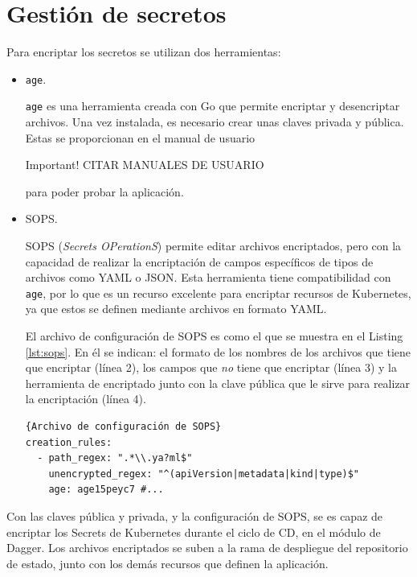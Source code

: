 \section{Gestión de secretos}
\label{sec:secrets}

Para encriptar los secretos se utilizan dos herramientas:

\begin{itemize}
  \item \texttt{age}\cite{age}.

    \texttt{age} es una herramienta creada con Go que permite encriptar y desencriptar archivos. Una vez instalada, es necesario crear unas claves privada y pública. Estas se proporcionan en el manual de usuario
    \begin{bclogo}[logo=\bcattention]{Important!}
      CITAR MANUALES DE USUARIO
    \end{bclogo}
    para poder probar la aplicación.
  \item SOPS\cite{sops}.

    SOPS (\textit{Secrets OPerationS}) permite editar archivos encriptados, pero con la capacidad de realizar la encriptación de campos específicos de tipos de archivos como YAML o JSON. Esta herramienta tiene compatibilidad con \texttt{age}, por lo que es un recurso excelente para encriptar recursos de Kubernetes, ya que estos se definen mediante archivos en formato YAML.

    El archivo de configuración de SOPS es como el que se muestra en el Listing \ref{lst:sops}. En él se indican: el formato de los nombres de los archivos que tiene que encriptar (línea 2), los campos que \textit{no} tiene que encriptar (línea 3) y la herramienta de encriptado junto con la clave pública que le sirve para realizar la encriptación (línea 4).

\begin{lstlisting}[language=helm,label=lst:sops]{Archivo de configuración de SOPS}
creation_rules:
  - path_regex: ".*\\.ya?ml$"
    unencrypted_regex: "^(apiVersion|metadata|kind|type)$"
    age: age15peyc7 #...
\end{lstlisting}

\end{itemize}

Con las claves pública y privada, y la configuración de SOPS, se es capaz de encriptar los Secrets de Kubernetes durante el ciclo de CD, en el módulo de Dagger. Los archivos encriptados se suben a la rama de despliegue del repositorio de estado, junto con los demás recursos que definen la aplicación.

